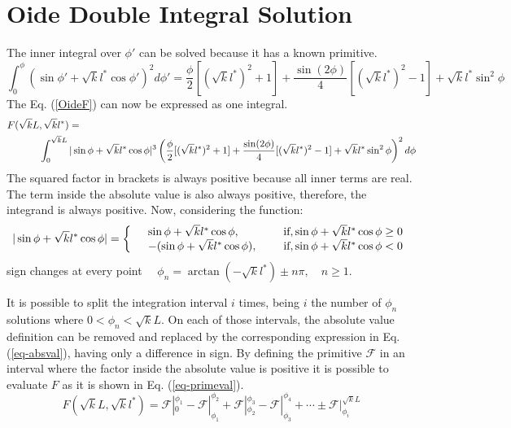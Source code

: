 \chapter{Oide Double Integral Solution}\label{c:primitiveF}
The inner integral over $\phi'$ can be solved because it has a known primitive.
\begin{equation}
 \int_0^\phi (\sin \phi'+ \sqrt{k}l^*\cos\phi')^2d\phi'=\frac{\phi}{2}[(\sqrt{k}l^*)^2 +1 ] + \frac{\sin(2\phi)}{4}[(\sqrt{k}l^*)^2 -1]+\sqrt{k}l^*\sin^2\phi
\end{equation}
The Eq. (\ref{OideF}) can now be expressed as one integral.
{\scriptsize
\begin{align}
F(\sqrt{k}L&,\sqrt{k}l^*) =\\
&\int_0^{ \sqrt{k}L} |\sin\phi+\sqrt{k}l^*\cos\phi|^3 \left( \frac{\phi}{2}[(\sqrt{k}l^*)^2 +1 ] + \frac{\sin(2\phi)}{4}[(\sqrt{k}l^*)^2 -1]+\sqrt{k}l^*\sin^2\phi\right)^2 d\phi\notag
\end{align}
}
The squared factor in brackets is always positive because all inner terms are real. The term inside the absolute value is also always positive, therefore, the integrand is always positive. Now, considering the function:
  \begin{equation}
  |\sin \phi + \sqrt{k}l^*\cos\phi|=\left\{
  \begin{array}{c l l}
&  \sin\phi+\sqrt{k}l^*\cos	\phi,\quad\qquad&\text{if}, \sin\phi+	\sqrt{k}l^*\cos	\phi\geq0\\
&  -(\sin\phi+\sqrt{k}l^*\cos\phi),\quad&\text{if}, \sin\phi+	\sqrt{k}l^*\cos	\phi<0
  \end{array}\right.\label{eq-absval}
 \end{equation}
sign changes at every point $\quad\phi_n = \arctan(-\sqrt{ k}l^*)\pm n\pi,\quad n\geq1$.\par
It is possible to split the integration interval $i$ times, being $i$ the number of $\phi_n$ solutions where $0<\phi_n<\sqrt{k}L$. On each of those intervals, the absolute value definition can be removed and replaced by the corresponding expression in Eq. (\ref{eq-absval}), having only a difference in sign. By defining the primitive $\mathscr{F}$ in an interval where the factor inside the absolute value is positive it is possible to evaluate $F$ as it is shown in Eq. (\ref{eq-primeval}).
\begin{equation}
 F(\sqrt{k}L,\sqrt{k}l^*)= \mathscr{F}|_0^{\phi_1} - \mathscr{F}|_{\phi_1}^{\phi_2} +  \mathscr{F}|_{\phi_2}^{\phi_3} - \mathscr{F}|_{\phi_3}^{\phi_4}+ \cdots \pm  \mathscr{F}|_{\phi_i}^{\sqrt{k}L}\label{eq-primeval}
\end{equation}
